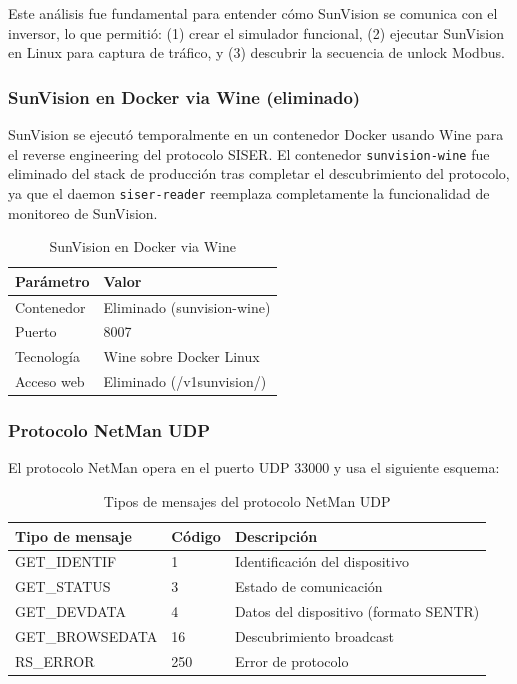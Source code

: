\documentclass[12pt,a4paper]{article}
\begin{document}
Este an\'alisis fue fundamental para entender c\'omo SunVision se comunica con el inversor, lo que permiti\'o: (1) crear el simulador funcional, (2) ejecutar SunVision en Linux para captura de tr\'afico, y (3) descubrir la secuencia de unlock Modbus.

\subsubsection{SunVision en Docker via Wine (eliminado)}

SunVision se ejecut\'o temporalmente en un contenedor Docker usando Wine para el reverse engineering del protocolo SISER. El contenedor \texttt{sunvision-wine} fue eliminado del stack de producci\'on tras completar el descubrimiento del protocolo, ya que el daemon \texttt{siser-reader} reemplaza completamente la funcionalidad de monitoreo de SunVision.

\begin{table}[H]
\centering
\begin{tabular}{ll}
\toprule
\textbf{Par\'ametro} & \textbf{Valor} \\
\midrule
Contenedor & Eliminado (sunvision-wine) \\
Puerto & 8007 \\
Tecnolog\'ia & Wine sobre Docker Linux \\
Acceso web & Eliminado (/v1sunvision/) \\
\bottomrule
\end{tabular}
\caption{SunVision en Docker via Wine}
\end{table}

\subsubsection{Protocolo NetMan UDP}

El protocolo NetMan opera en el puerto UDP 33000 y usa el siguiente esquema:

\begin{table}[H]
\centering
\begin{tabular}{lll}
\toprule
\textbf{Tipo de mensaje} & \textbf{C\'odigo} & \textbf{Descripci\'on} \\
\midrule
GET\_IDENTIF & 1 & Identificaci\'on del dispositivo \\
GET\_STATUS & 3 & Estado de comunicaci\'on \\
GET\_DEVDATA & 4 & Datos del dispositivo (formato SENTR) \\
GET\_BROWSEDATA & 16 & Descubrimiento broadcast \\
RS\_ERROR & 250 & Error de protocolo \\
\bottomrule
\end{tabular}
\caption{Tipos de mensajes del protocolo NetMan UDP}
\end{table}
\end{document}
